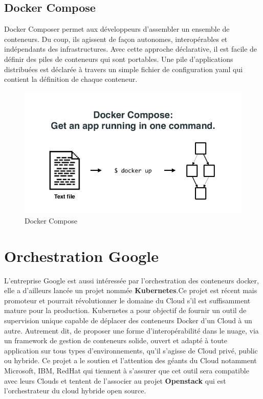 \begin{onehalfspace}
\subsection*{Docker Compose}
  Docker Composer permet aux développeurs d'assembler un ensemble de conteneurs. Du coup, ils agissent de façon autonomes, interopérables et indépendants des infrastructures. Avec cette approche déclarative, il est facile de définir des piles de conteneurs qui sont portables. Une pile d'applications distribuées est déclarée à travers un simple fichier de configuration \acrshort{yaml} qui contient la définition de chaque conteneur.
\begin{figure}[H]
\centering
\includegraphics [scale=0.5]{chapitre3/assets/dockercompose.jpg}
\caption{Docker Compose}
\end{figure}
\section{Orchestration Google}


L'entreprise Google est aussi intéressée par l'orchestration des conteneurs docker, elle a d'ailleurs lancée un projet nommée \textbf{Kubernetes}.Ce projet est récent mais promoteur et pourrait révolutionner le domaine du Cloud s'il est suffisamment mature pour la production. Kubernetes a pour objectif de fournir un outil de supervision unique capable de déplacer des conteneurs Docker d'un Cloud à un autre. Autrement dit, de proposer une forme d'interopérabilité dans le nuage, via un framework de gestion de conteneurs solide, ouvert et adapté à toute application sur tous types d'environnements, qu'il s'agisse de Cloud privé, public ou hybride. Ce projet a le soutien et l'attention des géants du Cloud notamment Microsoft, IBM, RedHat qui tiennent à s'assurer que cet outil sera compatible avec leurs Clouds et tentent de l'associer au projet \textbf{Openstack} qui est l'orchestrateur du cloud hybride open source.

\end{onehalfspace}
